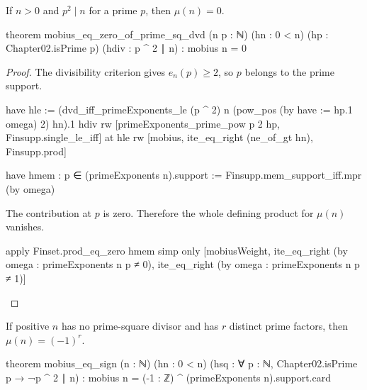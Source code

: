 \begin{theorem}
  \label{ent:thm:mobius-eq-zero-of-prime-sq-dvd}
  If $n>0$ and $p^2\mid n$ for a prime $p$, then $\mu(n)=0$.

  \begin{lean}
    theorem mobius_eq_zero_of_prime_sq_dvd (n p : ℕ) (hn : 0 < n)
        (hp : Chapter02.isPrime p) (hdiv : p ^ 2 ∣ n) : mobius n = 0
  \end{lean}
\end{theorem}

\begin{proof}
  The divisibility criterion gives $e_n(p)\ge2$, so $p$ belongs to the prime support.

  \begin{lean}
    have hle := (dvd_iff_primeExponents_le (p ^ 2) n
      (pow_pos (by
          have := hp.1
          omega) 2) hn).1 hdiv
    rw [primeExponents_prime_pow p 2 hp, Finsupp.single_le_iff] at hle
    rw [mobius, ite_eq_right (ne_of_gt hn), Finsupp.prod]

    have hmem : p ∈ (primeExponents n).support :=
      Finsupp.mem_support_iff.mpr (by omega)
  \end{lean}

  The contribution at $p$ is zero.
  Therefore the whole defining product for $\mu(n)$ vanishes.

  \begin{lean}
    apply Finset.prod_eq_zero hmem
    simp only [mobiusWeight, ite_eq_right (by omega : primeExponents n p ≠ 0),
      ite_eq_right (by omega : primeExponents n p ≠ 1)]
  \end{lean}
\end{proof}

\begin{theorem}
  \label{ent:thm:mobius-eq-sign}
  If positive $n$ has no prime-square divisor and has $r$ distinct prime factors, then
  $\mu(n)=(-1)^r$.

  \begin{lean}
    theorem mobius_eq_sign (n : ℕ) (hn : 0 < n)
        (hsq : ∀ p : ℕ, Chapter02.isPrime p → ¬p ^ 2 ∣ n) :
        mobius n = (-1 : ℤ) ^ (primeExponents n).support.card
  \end{lean}
\end{theorem}

